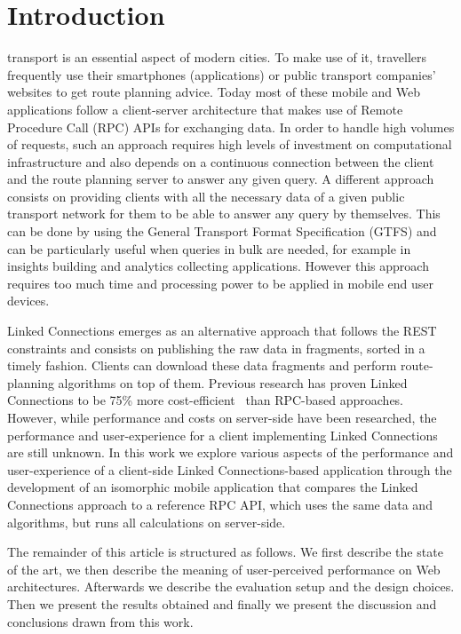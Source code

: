 \documentclass[twocolumn]{phdsymp} %
\begin{document}
\section{Introduction}
 transport is an essential aspect of modern cities. To make use of it, travellers frequently use their smartphones (applications) or public transport companies' websites to get route planning advice. Today most of these mobile and Web applications follow a client-server architecture that makes use of Remote Procedure Call (RPC) APIs for exchanging data. In order to handle high volumes of requests, such an approach requires high levels of investment on computational infrastructure and also depends on a continuous connection between the client and the route planning server to answer any given query. A different approach consists on providing clients with all the necessary data of a given public transport network for them to be able to answer any query by themselves. This can be done by using the General Transport Format Specification (GTFS) and can be particularly useful when queries in bulk are needed, for example in insights building and analytics collecting applications. However this approach requires too much time and processing power to be applied in mobile end user devices.

Linked Connections emerges as an alternative approach that follows the REST constraints and consists on publishing the raw data in fragments, sorted in a timely fashion. Clients can download these data fragments and perform route-planning algorithms on top of them. Previous research has proven Linked Connections to be 75\% more cost-efficient~\cite{colpaert17} than RPC-based approaches. However, while performance and costs on server-side have been researched, the performance and user-experience for a client implementing Linked Connections are still unknown. In this work we explore various aspects of the performance and user-experience of a client-side Linked Connections-based application through the development of an isomorphic mobile application that compares the Linked Connections approach to a reference RPC API, which uses the same data and algorithms, but runs all calculations on server-side.

The remainder of this article is structured as follows. We first describe the state of the art, we then describe the meaning of user-perceived performance on Web architectures. Afterwards we describe the evaluation setup and the design choices. Then we present the results obtained and finally we present the discussion and conclusions drawn from this work.
\end{document}
